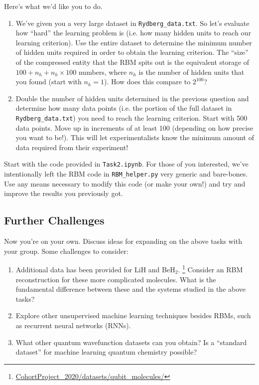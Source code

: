 \documentclass[12pt]{article}
\begin{document}
Here's what we'd like you to do.
\begin{enumerate}
    \item We've given you a very large dataset in \texttt{Rydberg\_data.txt}. So let's evaluate how ``hard'' the learning problem is (i.e. how many hidden units to reach our learning criterion). Use the entire dataset to determine the minimum number of hidden units required in order to obtain the learning criterion. The ``size'' of the compressed entity that the RBM spits out is the equivalent storage of $100 + n_h + n_h \times 100$ numbers, where $n_h$ is the number of hidden units that you found (start with $n_h = 1$). How does this compare to $2^{100}$? 
    \item Double the number of hidden units determined in the previous question and determine how many data points (i.e. the portion of the full dataset in \texttt{Rydberg\_data.txt}) you need to reach the learning criterion. Start with 500 data points. Move up in increments of at least 100 (depending on how precise you want to be!). This will let experimentalists know the minimum amount of data required from their experiment!
\end{enumerate}

Start with the code provided in \texttt{Task2.ipynb}. For those of you interested, we've intentionally left the RBM code in \texttt{RBM\_helper.py} very generic and bare-bones. Use any means necessary to modify this code (or make your own!) and try and improve the results you previously got.

\subsection*{Further Challenges} \label{sec:challenges}

Now you're on your own.  Discuss ideas for expanding on the above tasks with your group.  Some challenges to consider:
\begin{enumerate}
\item Additional data has been provided for LiH and BeH$_2$. 
\footnote{ \href{https://github.com/CDL-Quantum/CohortProject_2020/tree/master/datasets/qubit_molecules}{CohortProject\_2020/datasets/qubit\_molecules/} }
Consider an RBM reconstruction for these more complicated molecules.  What is the fundamental difference between these and the systems studied in the above tasks?
\item Explore other unsupervised machine learning techniques besides RBMs, such as recurrent neural networks (RNNs).
\item What other quantum wavefunction datasets can you obtain?  Is a ``standard dataset'' for machine learning quantum chemistry possible?
\end{enumerate}
\end{document}
